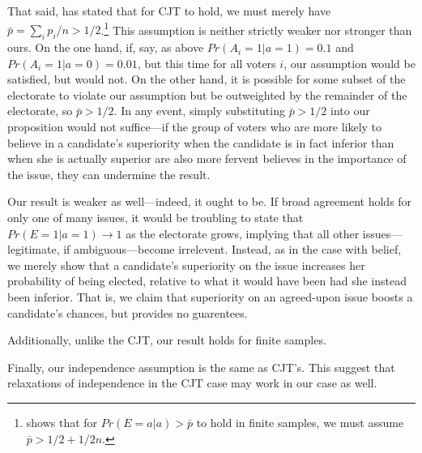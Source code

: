 \documentclass[11pt]{article}
\begin{document}
That said, \citet{dietrich2008premises} has stated that for CJT to
hold, we must merely have $\bar{p}=\sum_i
p_i/n>1/2$.\footnote{\citet{boland1989majority} shows that for
  $Pr(E=a|a)>\bar{p}$ to hold in finite samples, we must assume $\bar{p}>1/2 +1/2n$.}
This assumption is neither strictly weaker nor stronger than ours.
On the one hand, if, say, as above 
$Pr(A_i=1|a=1)=0.1$ and $Pr(A_i=1|a=0)=0.01$, but this time for all
voters $i$, our assumption would be satisfied, but
\citet{dietrich2008premises} would not.
On the other hand, it is possible for some subset of the electorate to
violate our assumption but be outweighted by the remainder of the
electorate, so $\bar{p}>1/2$.
In any event, simply substituting $\bar{p}>1/2$ into our proposition
would not suffice---if the group of voters who are more likely to
believe in a candidate's superiority when the candidate is in fact
inferior than when she is actually superior are also more fervent
believes in the importance of the issue, they can undermine the
result. 

Our result is weaker as well---indeed, it ought to be. 
If broad agreement holds for only one of many issues, it would be
troubling to state that $Pr(E=1|a=1)\rightarrow 1$ as the electorate
grows, implying that all other issues---legitimate, if
ambiguous---become irrelevent. 
Instead, as in the case with belief, we merely show that a candidate's
superiority on the issue increases her probability of being elected,
relative to what it would have been had she instead been inferior. 
That is, we claim that superiority on an agreed-upon issue boosts a
candidate's chances, but provides no guarentees. 

Additionally, unlike the CJT, our result holds for finite samples.

Finally, our independence assumption is the same as CJT's. 
This suggest that relaxations of independence in the CJT case
\citep[e.g.]{boland1989modelling} may work in our case as well. 
\end{document}
